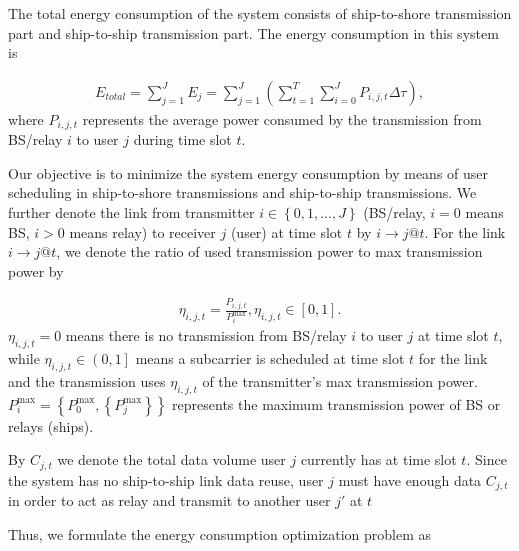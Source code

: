 \documentclass{ieeeaccess}
\begin{document}
The total energy consumption of the system consists of ship-to-shore transmission part and ship-to-ship transmission part. The energy consumption in this system is

\begin{align}
{{E_{total}} = \sum\limits_{j = 1}^J {{E_j}}  = \sum\limits_{j = 1}^J {\left( {\sum\limits_{t = 1}^T {\sum\limits_{i = 0}^J {{P_{i,j,t}}\Delta \tau } } } \right)} },
\end{align}
where ${P_{i,j,t}}$ represents the average power consumed by the transmission from BS/relay $i$ to user $j$ during time slot $t$.

Our objective is to minimize the system energy consumption by means of user scheduling in ship-to-shore transmissions and ship-to-ship transmissions. We further denote the link from transmitter $i \in \left\{ {0,1,...,J} \right\}$ (BS/relay, $i = 0$ means BS, $i > 0$ means relay) to receiver $j$ (user) at time slot $t$ by $i \to j@t$. For the link $i \to j@t$, we denote the ratio of used transmission power to max transmission power by 

\begin{align}
{{\eta _{i,j,t}} = \frac{{{P_{i,j,t}}}}{{P_i^{\max }}},{\eta _{i,j,t}} \in \left[ {0,1} \right]}.
\end{align}
${\eta _{i,j,t}} = 0$ means there is no transmission from BS/relay $i$ to user $j$ at time slot $t$, while ${\eta _{i,j,t}} \in \left( {0,1} \right]$ means a subcarrier is scheduled at time slot $t$ for the link and the transmission uses ${\eta _{i,j,t}}$ of the transmitter's max transmission power. $P_i^{\max } = \left\{ {P_0^{\max },\left\{ {P_j^{\max }} \right\}} \right\}$ represents the maximum transmission power of BS or relays (ships). 

By ${C_{j,t}}$ we denote the total data volume user $j$ currently has at time slot $t$. Since the system has no ship-to-ship link data reuse, user $j$ must have enough data ${C_{j,t}}$ in order to act as relay and transmit to another user $j'$ at $t$

Thus, we formulate the energy consumption optimization problem as
\end{document}
